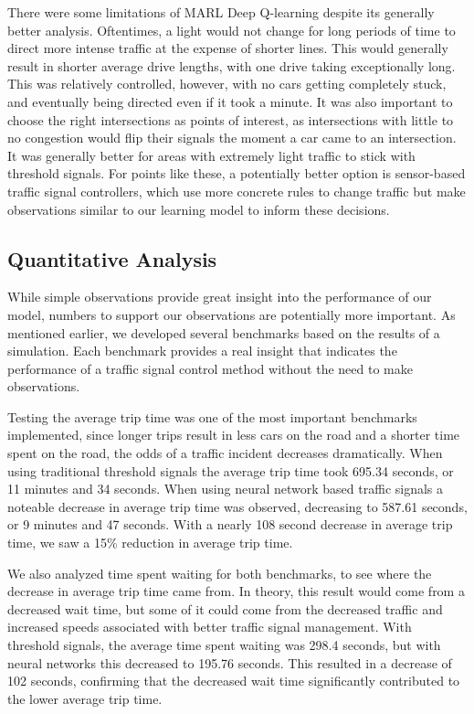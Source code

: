 \documentclass[conference]{IEEEtran}
\begin{document}
There were some limitations of MARL Deep Q-learning despite its generally better analysis. Oftentimes, a light would not change for long periods of time to direct more intense traffic at the expense of shorter lines. This would generally result in shorter average drive lengths, with one drive taking exceptionally long. This was relatively controlled, however, with no cars getting completely stuck, and eventually being directed even if it took a minute. It was also important to choose the right intersections as points of interest, as intersections with little to no congestion would flip their signals the moment a car came to an intersection. It was generally better for areas with extremely light traffic to stick with threshold signals. For points like these, a potentially better option is sensor-based traffic signal controllers, which use more concrete rules to change traffic but make observations similar to our learning model to inform these decisions. 

\subsection{Quantitative Analysis}

While simple observations provide great insight into the performance of our model, numbers to support our observations are potentially more important. As mentioned earlier, we developed several benchmarks based on the results of a simulation. Each benchmark provides a real insight that indicates the performance of a traffic signal control method without the need to make observations. 

Testing the average trip time was one of the most important benchmarks implemented, since longer trips result in less cars on the road and a shorter time spent on the road, the odds of a traffic incident decreases dramatically. When using traditional threshold signals the average trip time took 695.34 seconds, or 11 minutes and 34 seconds. When using neural network based traffic signals a noteable decrease in average trip time was observed, decreasing to 587.61 seconds, or 9 minutes and 47 seconds. With a nearly 108 second decrease in average trip time, we saw a 15\% reduction in average trip time. 

We also analyzed time spent waiting for both benchmarks, to see where the decrease in average trip time came from. In theory, this result would come from a decreased wait time, but some of it could come from the decreased traffic and increased speeds associated with better traffic signal management. With threshold signals, the average time spent waiting was 298.4 seconds, but with neural networks this decreased to 195.76 seconds. This resulted in a decrease of 102 seconds, confirming that the decreased wait time significantly contributed to the lower average trip time. 
\end{document}
